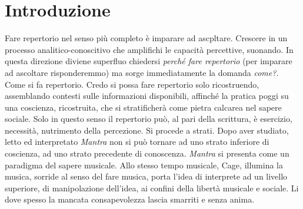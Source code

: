 

\chapter*{Introduzione}

\vfill

\begin{multicols}{2}

Fare repertorio nel senso pi\`u completo \`e imparare ad ascpltare. Crescere in un processo analitico-conoscitivo che amplifichi le capacità percettive, suonando. In questa direzione diviene superfluo chiedersi \emph{perché fare repertorio} (per imparare ad ascoltare risponderemmo) ma sorge immediatamente la domanda \emph{come?}. Come si fa repertorio. Credo si possa fare repertorio solo ricostruendo, assemblando contesti sulle informazioni disponibili, affinch\'e la pratica poggi su una coscienza, ricostruita, che si stratificherà come pietra calcarea nel sapere sociale. Solo in questo senso il repertorio può, al pari della scrittura, è esercizio, necessità, nutrimento della percezione. Si procede a strati. Dopo aver studiato, letto ed interpretato \emph{Mantra} non si può tornare ad uno strato inferiore di coscienza, ad uno strato precedente di conoscenza. \emph{Mantra} si presenta come un paradigma del sapere musicale. Allo stesso tempo musicale, Cage, illumina la musica, sorride al senso del fare musica, porta l'idea di interprete ad un livello superiore, di manipolazione dell'idea, ai confini della libertà musicale e sociale. Li dove spesso la mancata consapevolezza lascia smarriti e senza anima.


\end{multicols}
